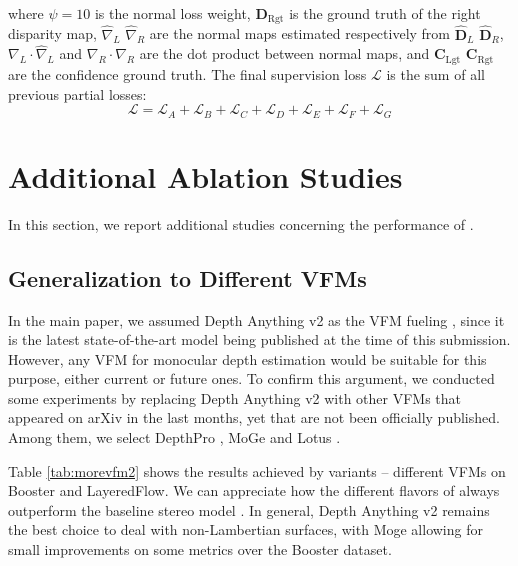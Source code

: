 where $\psi=10$ is the normal loss weight, $\mathbf{D}_\text{Rgt}$ is the ground truth of the right disparity map, $\hat{\nabla}_L$ $\hat{\nabla}_R$ are the normal maps estimated respectively from $\hat{\mathbf{D}}_L$ $\hat{\mathbf{D}}_R$, $\nabla_L\cdot\hat{\nabla}_L$ and $\nabla_R\cdot\hat{\nabla}_R$ are the dot product between normal maps, and $\mathbf{C}_\text{Lgt}$ $\mathbf{C}_\text{Rgt}$ are the confidence ground truth.
The final supervision loss $\mathcal{L}$ is the sum of all previous partial losses:
\small\begin{equation}
    \mathcal{L} = \mathcal{L}_A + \mathcal{L}_B + \mathcal{L}_C + \mathcal{L}_D + \mathcal{L}_E + \mathcal{L}_F + \mathcal{L}_G
    \label{eq:total_loss}
\end{equation}\normalsize

\section{Additional Ablation Studies}
\label{sec:ablation}
In this section, we report additional studies concerning the performance of \method.

\subsection{Generalization to Different VFMs}
\label{subsec:ablation_VFM}

In the main paper, we assumed Depth Anything v2 \cite{depth_anything_v2} as the VFM fueling \method, since it is the latest state-of-the-art model being published at the time of this submission. 
However, any VFM for monocular depth estimation would be suitable for this purpose, either current or future ones. To confirm this argument, we conducted some experiments by replacing Depth Anything v2 with other VFMs that appeared on arXiv in the last months, yet that are not been officially published. Among them, we select DepthPro \cite{depthpro}, MoGe \cite{wang2024moge} and Lotus \cite{he2024lotus}.

Table \ref{tab:morevfm2} shows the results achieved by \method variants -- different VFMs on Booster and LayeredFlow. We can appreciate how the different flavors of \method always outperform the baseline stereo model \cite{lipson2021raft}. In general, Depth Anything v2 remains the best choice to deal with non-Lambertian surfaces, with Moge allowing for small improvements on some metrics over the Booster dataset.



